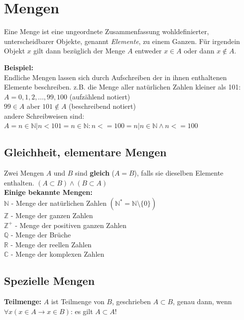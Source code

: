\documentclass[12pt]{scrartcl}
\begin{document}

\newpage
\section{Mengen}

Eine Menge ist eine ungeordnete Zusammenfassung wohldefinierter, unterscheidbarer
Objekte, genannt \textit{Elemente}, zu einem Ganzen. Für irgendein Objekt $x$ 
gilt dann bezüglich der Menge $A$ entweder $x \in A$ oder dann $x \notin A$.

\textbf{Beispiel:}\\
Endliche Mengen lassen sich durch Aufschreiben der in ihnen enthaltenen Elemente beschreiben.
z.B. die Menge aller natürlichen Zahlen kleiner als 101:\\
$A = {0, 1, 2, ..., 99, 100}$ (aufzählend notiert)\\
$99 \in A$ aber $101 \notin A$ (beschreibend notiert)\\

andere Schreibweisen sind: \\

$A = {n \in \mathbb{N} | n < 101} = {n \in \mathbb{N} : n <= 100} = {n|n \in \mathbb{N} \land n <= 100}$\\

\subsection{Gleichheit, elementare Mengen}
Zwei Mengen $A$ und $B$ sind \textbf{gleich} ($A = B$), falls sie dieselben Elemente enthalten.
$(A \subset B) \land (B \subset A)$\\

\textbf{Einige bekannte Mengen:}\\
$\mathbb{N}$ - \quad Menge der natürlichen Zahlen $(\mathbb{N}^* = \mathbb{N} \setminus \{0\})$\\
$\mathbb{Z}$ - \quad Menge der ganzen Zahlen\\
$\mathbb{Z}^+$ - \quad Menge der positiven ganzen Zahlen\\
$\mathbb{Q}$ - \quad Menge der Brüche\\
$\mathbb{R}$ - \quad Menge der reellen Zahlen\\
$\mathbb{C}$ - \quad Menge der komplexen Zahlen\\

\subsection{Spezielle Mengen}
\textbf{Teilmenge:} $A$ ist Teilmenge von $B$, geschrieben $A \subset B$, genau dann, wenn
$\forall x (x \in A \rightarrow x \in B)$: es gilt $A \subset A$!\\
\end{document}

